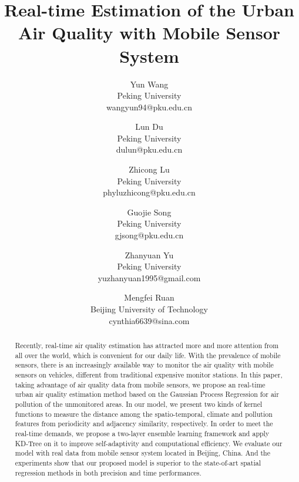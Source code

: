 \documentclass[twoside,leqno,twocolumn]{article}
\begin{document}
\title{\Large Real-time Estimation of the Urban Air Quality with Mobile Sensor System}
\author{Yun Wang\\
Peking University\\
wangyun94@pku.edu.cn\\
\and
Lun Du\\
Peking University\\
dulun@pku.edu.cn\\
\and
Zhicong Lu\\
Peking University\\
phyluzhicong@pku.edu.cn\\
\and
Guojie Song\\
Peking University\\
gjsong@pku.edu.cn\\
\and
Zhanyuan Yu\\
Peking University\\
yuzhanyuan1995@gmail.com\\
\and
Mengfei Ruan\\
Beijing University of Technology\\
cynthia6639@sina.com\\
}
\maketitle

\begin{abstract} \small\baselineskip=9pt
Recently, real-time air quality estimation has attracted more and more attention from all over the world, which is convenient for our daily life. With the prevalence of mobile sensors, there is an increasingly available way to monitor the air quality with mobile sensors on vehicles, different from traditional expensive monitor stations. In this paper, taking advantage of air quality data from mobile sensors, we propose an real-time urban air quality estimation method based on the Gaussian Process Regression for air pollution of the unmonitored areas. In our model, we present two kinds of kernel functions to measure the distance among the spatio-temporal, climate and pollution features from periodicity and adjacency similarity, respectively. In order to meet the real-time demands, we propose a two-layer ensemble learning framework and apply KD-Tree on it to improve self-adaptivity and computational efficiency. We evaluate our model with real data from mobile sensor system located in Beijing, China. And the experiments show that our proposed model is superior to the state-of-art spatial regression methods in both precision and time performances.
\end{abstract}
\end{document}
